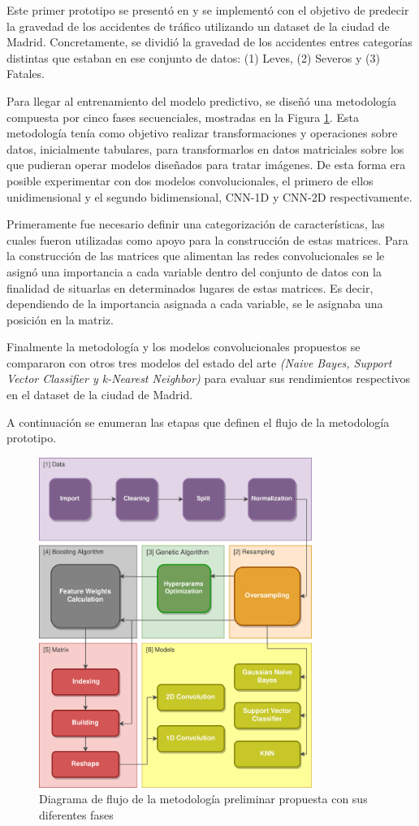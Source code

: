 Este primer prototipo se presentó en \cite{PEREZSALA2023113245} y se implementó con el objetivo de predecir la gravedad de los accidentes de tráfico utilizando un dataset de la ciudad de Madrid. Concretamente, se dividió la gravedad de los accidentes entres categorías distintas que estaban en ese conjunto de datos: (1) Leves, (2) Severos y (3) Fatales.

Para llegar al entrenamiento del modelo predictivo, se diseñó una metodología compuesta por cinco fases secuenciales, mostradas en la Figura \ref{figDegree}. Esta metodología tenía como objetivo realizar transformaciones y operaciones sobre datos, inicialmente tabulares, para transformarlos en datos matriciales sobre los que pudieran operar modelos diseñados para tratar imágenes. De esta forma era posible experimentar con dos modelos convolucionales, el primero de ellos unidimensional y el segundo bidimensional, CNN-1D y CNN-2D respectivamente.

Primeramente fue necesario definir una categorización de características, las cuales fueron utilizadas como apoyo para la construcción de estas matrices. Para la construcción de las matrices que alimentan las redes convolucionales se le asignó una importancia a cada variable dentro del conjunto de datos con la finalidad de situarlas en determinados lugares de estas matrices. Es decir, dependiendo de la importancia asignada a cada variable, se le asignaba una posición en la matriz. 

Finalmente la metodología y los modelos convolucionales propuestos se compararon con otros tres modelos del estado del arte \textit{(Naive Bayes, Support Vector Classifier y k-Nearest Neighbor)} para evaluar sus rendimientos respectivos en el dataset de la ciudad de Madrid.

A continuación se enumeran las etapas que definen el flujo de la metodología prototipo.

\begin{figure}[h]
	\centering
	\includegraphics[width=3.5in]{Figures/1stPaper/Data_flow.png}
	\caption{Diagrama de flujo de la metodología preliminar propuesta con sus diferentes fases}
	\label{figDegree}
\end{figure}

